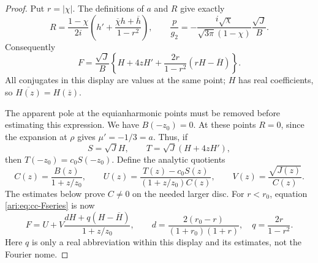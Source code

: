 \begin{proof}
Put $r=|\chi|$. The definitions of $a$ and $R$ give exactly
\[
 R=\frac{1-\chi}{2i}
       \left(h'+\frac{\overline \chi h+\overline h}{1-r^2}\right),
 \qquad
 \frac p{g_2}=-\frac{i\sqrt \chi}{\sqrt{3\pi}(1-\chi)}
                         \frac{\sqrt J}{B}.
\]
Consequently
\begin{equation}\label{ari:eq:cc-Fseries}
 F=\frac{\sqrt J}{B}
 \left\{H+4zH'+\frac{2r}{1-r^2}(rH-\overline H)\right\}.
\end{equation}
All conjugates in this display are values at the same point;
$H$ has real coefficients, so $\overline{H(z)}=H(\overline z)$.

The apparent pole at the equianharmonic points must be removed
before estimating this expression. We have $B(-z_0)=0$.
At these points $R=0$, since the expansion at $\rho$ gives
$\mu'=-1/3=a$. Thus, if
\[
 S=\sqrt J H,\qquad T=\sqrt J(H+4zH'),
\]
then $T(-z_0)=c_0S(-z_0)$. Define the analytic quotients
\[
 C(z)=\frac{B(z)}{1+z/z_0},\qquad
 U(z)=\frac{T(z)-c_0S(z)}{(1+z/z_0)C(z)},\qquad
 V(z)=\frac{\sqrt{J(z)}}{C(z)}.
\]
The estimates below prove $C\ne0$ on the needed larger disc.
For $r<r_0$, equation \eqref{ari:eq:cc-Fseries} is now
\begin{equation}\label{ari:eq:cc-Ffactored}
 F=U+V\frac{dH+q(H-\overline H)}{1+z/z_0},
 \qquad
 d=\frac{2(r_0-r)}{(1+r_0)(1+r)},\quad q=\frac{2r}{1-r^2}.
\end{equation}
Here $q$ is only a real abbreviation within this display and
its estimates, not the Fourier nome.


\end{proof}
